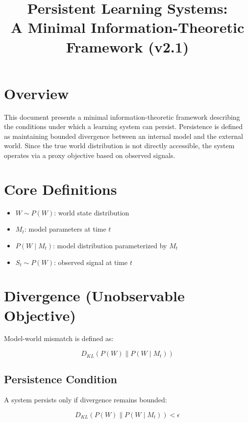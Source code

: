 \documentclass[11pt]{article}
\title{Persistent Learning Systems:\\
A Minimal Information-Theoretic Framework (v2.1)}
\author{}
\date{}
\begin{document}
\maketitle

\section{Overview}

This document presents a minimal information-theoretic framework describing the conditions under which a learning system can persist. Persistence is defined as maintaining bounded divergence between an internal model and the external world. Since the true world distribution is not directly accessible, the system operates via a proxy objective based on observed signals.

\section{Core Definitions}

\begin{itemize}
    \item $W \sim P(W)$: world state distribution
    \item $M_t$: model parameters at time $t$
    \item $P(W \mid M_t)$: model distribution parameterized by $M_t$
    \item $S_t \sim P(W)$: observed signal at time $t$
\end{itemize}

\section{Divergence (Unobservable Objective)}

Model-world mismatch is defined as:

\begin{equation}
D_{KL}(P(W) \parallel P(W \mid M_t))
\end{equation}

\subsection*{Persistence Condition}

A system persists only if divergence remains bounded:

\begin{equation}
D_{KL}(P(W) \parallel P(W \mid M_t)) < \epsilon
\end{equation}
\end{document}
